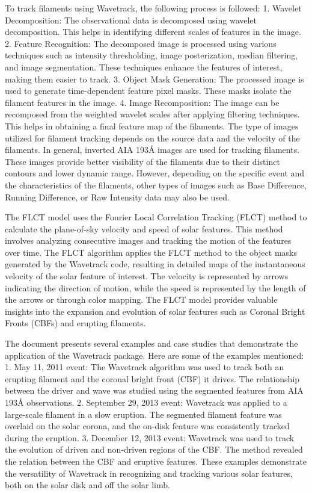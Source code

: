 To track filaments using Wavetrack, the following process is followed:
1. Wavelet Decomposition: The observational data is decomposed using wavelet decomposition. This helps in identifying different scales of features in the image.
2. Feature Recognition: The decomposed image is processed using various techniques such as intensity thresholding, image posterization, median filtering, and image segmentation. These techniques enhance the features of interest, making them easier to track.
3. Object Mask Generation: The processed image is used to generate time-dependent feature pixel masks. These masks isolate the filament features in the image.
4. Image Recomposition: The image can be recomposed from the weighted wavelet scales after applying filtering techniques. This helps in obtaining a final feature map of the filaments.
The type of images utilized for filament tracking depends on the source data and the velocity of the filaments. In general, inverted AIA 193Å images are used for tracking filaments. These images provide better visibility of the filaments due to their distinct contours and lower dynamic range. However, depending on the specific event and the characteristics of the filaments, other types of images such as Base Difference, Running Difference, or Raw Intensity data may also be used.

The FLCT model uses the Fourier Local Correlation Tracking (FLCT) method to calculate the plane-of-sky velocity and speed of solar features. This method involves analyzing consecutive images and tracking the motion of the features over time. The FLCT algorithm applies the FLCT method to the object masks generated by the Wavetrack code, resulting in detailed maps of the instantaneous velocity of the solar feature of interest. The velocity is represented by arrows indicating the direction of motion, while the speed is represented by the length of the arrows or through color mapping. The FLCT model provides valuable insights into the expansion and evolution of solar features such as Coronal Bright Fronts (CBFs) and erupting filaments.

The document presents several examples and case studies that demonstrate the application of the Wavetrack package. Here are some of the examples mentioned:
1. May 11, 2011 event: The Wavetrack algorithm was used to track both an erupting filament and the coronal bright front (CBF) it drives. The relationship between the driver and wave was studied using the segmented features from AIA 193Å observations.
2. September 29, 2013 event: Wavetrack was applied to a large-scale filament in a slow eruption. The segmented filament feature was overlaid on the solar corona, and the on-disk feature was consistently tracked during the eruption.
3. December 12, 2013 event: Wavetrack was used to track the evolution of driven and non-driven regions of the CBF. The method revealed the relation between the CBF and eruptive features.
These examples demonstrate the versatility of Wavetrack in recognizing and tracking various solar features, both on the solar disk and off the solar limb.

